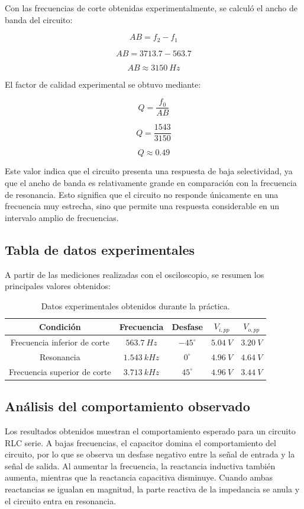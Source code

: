 Con las frecuencias de corte obtenidas experimentalmente, se calculó el ancho de banda del circuito:

\[
AB = f_2 - f_1
\]

\[
AB = 3713.7 - 563.7
\]

\[
AB \approx 3150~Hz
\]

El factor de calidad experimental se obtuvo mediante:

\[
Q = \frac{f_0}{AB}
\]

\[
Q = \frac{1543}{3150}
\]

\[
Q \approx 0.49
\]

Este valor indica que el circuito presenta una respuesta de baja selectividad, ya que el ancho de banda es relativamente grande en comparación con la frecuencia de resonancia. Esto significa que el circuito no responde únicamente en una frecuencia muy estrecha, sino que permite una respuesta considerable en un intervalo amplio de frecuencias.

\subsection{Tabla de datos experimentales}

A partir de las mediciones realizadas con el osciloscopio, se resumen los principales valores obtenidos:

\begin{table}[H]
	\centering
	\begin{tabular}{|c|c|c|c|c|}
		\hline
		\textbf{Condición} & \textbf{Frecuencia} & \textbf{Desfase} & \textbf{$V_{i,pp}$} & \textbf{$V_{o,pp}$} \\ \hline
		Frecuencia inferior de corte & $563.7~Hz$ & $-45^\circ$ & $5.04~V$ & $3.20~V$ \\ \hline
		Resonancia & $1.543~kHz$ & $0^\circ$ & $4.96~V$ & $4.64~V$ \\ \hline
		Frecuencia superior de corte & $3.713~kHz$ & $45^\circ$ & $4.96~V$ & $3.44~V$ \\ \hline
	\end{tabular}
	\caption{Datos experimentales obtenidos durante la práctica.}
	\label{tab:datos_experimentales}
\end{table}

\subsection{Análisis del comportamiento observado}

Los resultados obtenidos muestran el comportamiento esperado para un circuito RLC serie. A bajas frecuencias, el capacitor domina el comportamiento del circuito, por lo que se observa un desfase negativo entre la señal de entrada y la señal de salida. Al aumentar la frecuencia, la reactancia inductiva también aumenta, mientras que la reactancia capacitiva disminuye. Cuando ambas reactancias se igualan en magnitud, la parte reactiva de la impedancia se anula y el circuito entra en resonancia.

